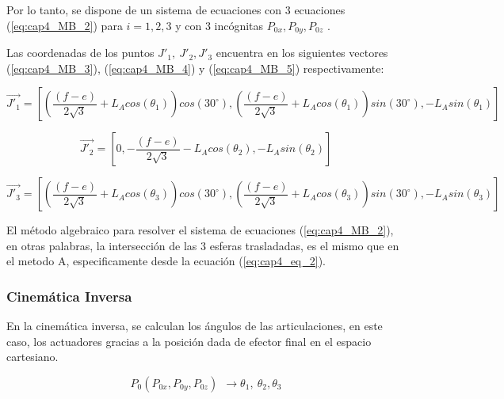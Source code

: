     Por lo tanto, se dispone de un sistema de ecuaciones con 3 ecuaciones (\ref{eq:cap4_MB_2}) para $i=1,2,3$ y con 3 incógnitas \( P_{0x},P_{0y},P_{0z} \) .  
    
    \newpage

    Las coordenadas de los puntos  \( J'_{1},~J'_{2},J'_{3} \)  encuentra en los siguientes vectores  (\ref{eq:cap4_MB_3}), (\ref{eq:cap4_MB_4}) y (\ref{eq:cap4_MB_5}) respectivamente:  
  
          \begin{equation}
                \overrightarrow{J'_{1}}= \left [\left( \frac{(f-e)}{2\sqrt{3}}+{L}_{A}cos(\theta_1)\right) cos(30^\circ), \left(\frac{(f-e)}{2\sqrt{3}} + {L}_{A}cos(\theta_1)\right) sin(30^\circ), -L_{A}sin(\theta_1)\right]
        \label{eq:cap4_MB_3}
        \end{equation}    
        
        \begin{equation}
                \overrightarrow{J'_{2}}= \left [  0,-\frac{(f-e)}{2\sqrt{3}}-L_{A}cos(\theta_2),-L_{A}sin(\theta_2)\right]
        \label{eq:cap4_MB_4}
        \end{equation}    
        
        \begin{equation}
                \overrightarrow{J'_{3}}= \left [\left( \frac{(f-e)}{2\sqrt{3}}+{L}_{A}cos(\theta_3)\right) cos(30^\circ), \left(\frac{(f-e)}{2\sqrt{3}} + {L}_{A}cos(\theta_3)\right) sin(30^\circ), -L_{A}sin(\theta_3)\right]
        \label{eq:cap4_MB_5}
        \end{equation}    
  
      El método algebraico para resolver el sistema de ecuaciones (\ref{eq:cap4_MB_2}), en otras palabras, la intersección de las 3 esferas trasladadas, es el mismo que en el metodo A, especificamente desde la ecuación (\ref{eq:cap4_eq_2}).
  
 \newpage
        
        

\subsubsection{Cinemática Inversa}\label{mb_ci}

      En la cinemática inversa, se calculan los ángulos de las articulaciones, en este caso, los actuadores gracias a la posición dada de efector final en el espacio cartesiano. 
      
        \begin{equation}
              P_{0} \left( P_{0x},P_{0y},P_{0z} \right) ~~ \rightarrow    \theta _{1},~ \theta _{2}, \theta _{3} 
        \label{eq:cap4_MB_6}
        \end{equation}\par      
      
